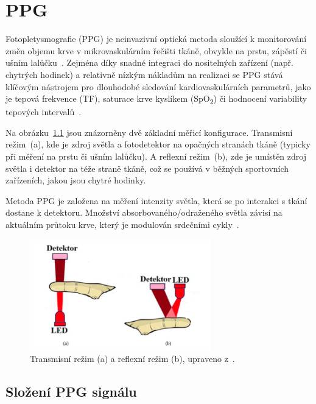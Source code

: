 \chapter{\acl{PPG}}
\label{chap:PPG_teorie}

Fotopletysmografie (\acs{PPG}) je neinvazivní optická metoda sloužící k monitorování změn objemu krve v mikrovaskulárním řečišti tkáně, obvykle na prstu, zápěstí či ušním lalůčku~\cite{Park2022}.
Zejména díky snadné integraci do nositelných zařízení (např. chytrých hodinek) a relativně nízkým nákladům na realizaci se \acs{PPG} stává klíčovým nástrojem pro dlouhodobé sledování kardiovaskulárních parametrů,
jako je tepová frekvence (\acs{TF}), saturace krve kyslíkem (SpO\textsubscript{2}) či hodnocení variability tepových intervalů~\cite{Orphanidou2018}.

Na obrázku~\ref{fig:snimaniPPG} jsou znázorněny dvě základní měřicí konfigurace.
Transmisní režim~(a), kde je zdroj světla a fotodetektor na opačných stranách tkáně (typicky při měření na prstu či ušním lalůčku).
A reflexní režim~(b), zde je umístěn zdroj světla i detektor na téže straně tkáně, což se používá v běžných sportovních zařízeních, jakou jsou chytré hodinky.

Metoda \acs{PPG} je založena na měření intenzity světla, která se po interakci s tkání dostane k detektoru.
Množství absorbovaného/odraženého světla závisí na aktuálním průtoku krve, který je modulován srdečními cykly~\cite{Park2022}.

\begin{figure}[h]
	\centering
	\includegraphics[width=0.7\textwidth]{./obrazky/snimaniPPG.png}
	\caption[Snímání PPG signálu]{Transmisní režim (a) a reflexní režim (b), upraveno z~\cite{ENIKÖ}.}
	\label{fig:snimaniPPG}
\end{figure}

\section{Složení \acs{PPG} signálu}

